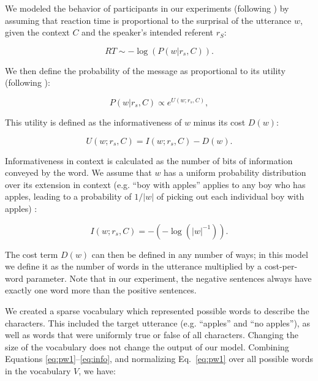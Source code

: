 \documentclass[10pt,letterpaper]{article}
\begin{document}
We modeled the behavior of participants in our experiments (following ) by assuming that reaction time is proportional to the surprisal of the utterance $w$, given the context $C$ and the speaker's intended referent $r_S$:

\begin{equation}\label{eq:surprise}
RT \sim -\log(P(w| r_s, C)).
\end{equation}

\noindent We then define the probability of the message as proportional to its utility (following ):

\begin{equation}\label{eq:pw1}
P(w | r_s, C) \propto  e^{U(w;r_s,C)},
\end{equation} 

\noindent This utility is defined as the informativeness of $w$ minus its cost $D(w)$:

\begin{equation}\label{eq:utility}
U(w;r_s,C) = I(w;r_s, C) - D(w).
\end{equation}

\noindent Informativeness in context is calculated as the number of bits of information conveyed by the word. We assume that $w$ has a uniform probability distribution over its extension in context (e.g. ``boy with apples'' applies to any boy who has apples, leading to a probability of $1/|w|$ of picking out each individual boy with apples) :

\begin{equation}\label{eq:info}
I(w;r_s, C) = -(-\log(|w|^{-1})).
\end{equation}

\noindent The cost term $D(w)$ can then be defined in any number of ways; in this model we define it as the number of words in the utterance multiplied by a cost-per-word parameter.  Note that in our experiment, the negative sentences always have exactly one word more than the positive sentences. 

We created a sparse vocabulary which represented possible words to describe the characters.  This included the target utterance (e.g. ``apples'' and ``no apples''), as well as words that were uniformly true or false of all characters. Changing the size of the vocabulary does not change the output of our model. Combining Equations \ref{eq:pw1}--\ref{eq:info}, and normalizing Eq.\ \ref{eq:pw1} over all possible words in the vocabulary $V$, we have:
\end{document}
